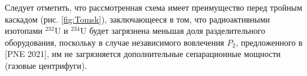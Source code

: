 Следует отметить, что рассмотренная схема имеет преимущество перед тройным каскадом (рис. \ref{fig:Tomsk}), заключающееся в том, что радиоактивными изотопами $^{232}$U и $^{234}$U будет загрязнена меньшая доля разделительного оборудования, поскольку в случае независимого вовлечения $P_2$, предложенного в [PNE 2021], им не загрязняется дополнительные сепарационные мощности (газовые центрифуги).

\clearpage